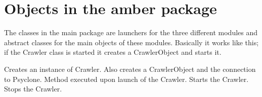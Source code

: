 \section{Objects in the amber package}

The classes in the main package are launchers for the three different modules
and abstract classes for the main objects of these modules. Basically it works
like this; if the Crawler class is started it creates a CrawlerObject and
starts it.


\begin{classmetadata}
\end{classmetadata}

\begin{interface}
    {Creates an instance of Crawler. Also creates a CrawlerObject and the
      connection to Psyclone.}
    {Method executed upon launch of the Crawler.}
    {Starts the Crawler.}
    {Stops the Crawler.}
\end{interface}




\begin{classmetadata}
\end{classmetadata}




\begin{classmetadata}
\end{classmetadata}




\begin{classmetadata}
\end{classmetadata}

